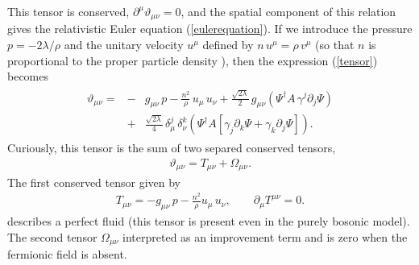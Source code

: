 \documentclass[11pt,a4paper]{article}
\begin{document}
This tensor is conserved, $\partial^\mu \vartheta_{\mu\nu}=0$, and the spatial component of this relation gives the relativistic Euler equation (\ref{eulerequation}). If we introduce the pressure $p=-2\lambda/\rho$ and the unitary velocity $u^\mu$ defined by $n\,u^\mu=\rho\,v^\mu$ (so that $n$ is proportional to the proper particle density ), then the expression (\ref{tensor}) becomes
\begin{eqnarray}
\begin{array}{lll}
\vartheta_{\mu\nu}=& - & \displaystyle{g_{\mu\nu}\,p-\frac{n^2}{\rho}\,u_\mu\,u_\nu+\frac{\sqrt{2\lambda}}{2}\,g_{\mu\nu}\left(\Psi^\dagger A\,\gamma^j\partial_j\Psi\right)}\\
[4mm]
                   & + &\displaystyle{\frac{\sqrt{2\lambda}}{4}\,\delta_\mu^j\,\delta_\nu^k\left(\Psi^\dagger A\left[\gamma_j\partial_k\Psi+\gamma_k\partial_j\Psi\right]\right)}.
\label{tensor'}
\end{array}
\end{eqnarray}
Curiously, this tensor is the sum of two separed conserved tensors,
\begin{eqnarray}
\vartheta_{\mu\nu}=T_{\mu\nu}+\Omega_{\mu\nu}.
\label{ro+}
\end{eqnarray}
The first conserved tensor given by
\begin{eqnarray}
T_{\mu\nu}=-g_{\mu\nu}\,p-\frac{n^2}{\rho}u_\mu\,u_\nu,\qquad \partial_\mu T^{\mu\nu}=0.
\label{man}
\end{eqnarray}
describes a perfect fluid \cite{LL} (this tensor is present even in the purely bosonic model). The second tensor $\Omega_{\mu\nu}$ interpreted as an improvement term \cite{JP} and \cite{VH} is zero when the fermionic field is absent.
\end{document}
